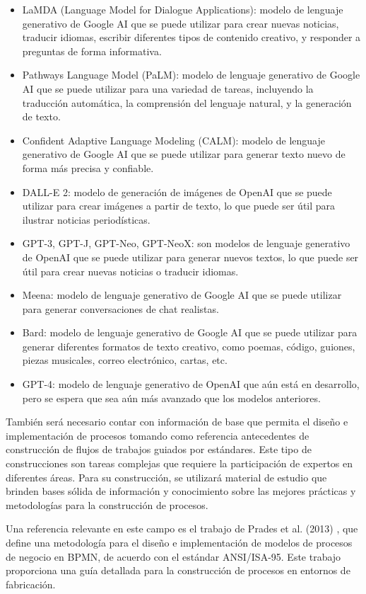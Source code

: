 \documentclass[12pt]{article}
\begin{document}
\begin{itemize}
    \item LaMDA (Language Model for Dialogue Applications): modelo de lenguaje generativo de Google AI que se puede utilizar para crear nuevas noticias, traducir idiomas, escribir diferentes tipos de contenido creativo, y responder a preguntas de forma informativa.
    \item Pathways Language Model (PaLM): modelo de lenguaje generativo de Google AI que se puede utilizar para una variedad de tareas, incluyendo la traducción automática, la comprensión del lenguaje natural, y la generación de texto.
    \item Confident Adaptive Language Modeling (CALM): modelo de lenguaje generativo de Google AI que se puede utilizar para generar texto nuevo de forma más precisa y confiable.
    \item DALL-E 2: modelo de generación de imágenes de OpenAI que se puede utilizar para crear imágenes a partir de texto, lo que puede ser útil para ilustrar noticias periodísticas.
    \item GPT-3, GPT-J, GPT-Neo, GPT-NeoX: son modelos de lenguaje generativo de OpenAI que se puede utilizar para generar nuevos textos, lo que puede ser útil para crear nuevas noticias o traducir idiomas.
    \item Meena: modelo de lenguaje generativo de Google AI que se puede utilizar para generar conversaciones de chat realistas.
    \item Bard: modelo de lenguaje generativo de Google AI que se puede utilizar para generar diferentes formatos de texto creativo, como poemas, código, guiones, piezas musicales, correo electrónico, cartas, etc.
    \item GPT-4: modelo de lenguaje generativo de OpenAI que aún está en desarrollo, pero se espera que sea aún más avanzado que los modelos anteriores. 
\end{itemize}

También será necesario contar con información de base que permita el diseño e implementación de procesos tomando como referencia antecedentes de construcción de flujos de trabajos guiados por estándares. Este tipo de construcciones son tareas complejas que requiere la participación de expertos en diferentes áreas. 
Para su construcción, se utilizará material de estudio que brinden bases sólida de información y conocimiento sobre las mejores prácticas y metodologías para la construcción de procesos.

Una referencia relevante en este campo es el trabajo de Prades et al. (2013) \cite{PRADES2013115}, que define una metodología para el diseño e implementación de modelos de procesos de negocio en BPMN, de acuerdo con el estándar ANSI/ISA-95. Este trabajo proporciona una guía detallada para la construcción de procesos en entornos de fabricación.
\end{document}
